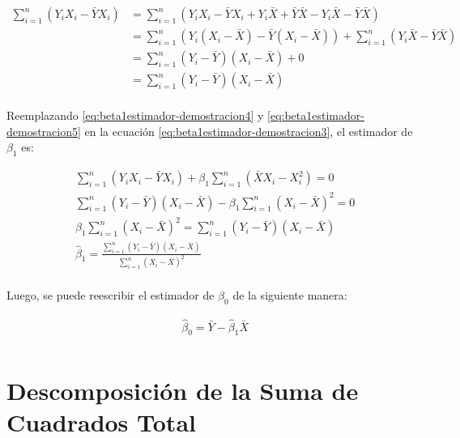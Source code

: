 \documentclass[
  11pt,
]{book}
\theoremstyle{definition}
\theoremstyle{definition}
\theoremstyle{definition}
\theoremstyle{definition}
\theoremstyle{remark}
\begin{document}
\begin{equation}
\begin{split}
\sum_{i=1}^n (Y_iX_i - \bar{Y}X_i) &= \sum_{i=1}^n (Y_iX_i - \bar{Y}X_i + Y_i\bar{X} + \bar{Y}\bar{X} - Y_i\bar{X} - \bar{Y}\bar{X})\\
&= \sum_{i=1}^n (Y_i(X_i - \bar{X}) - \bar{Y}(X_i - \bar{X})) + \sum_{i=1}^n(Y_i\bar{X} - \bar{Y}\bar{X}) \\
&= \sum_{i=1}^n (Y_i - \bar{Y})(X_i - \bar{X}) + 0 \\
&= \sum_{i=1}^n (Y_i - \bar{Y})(X_i - \bar{X})\\
\end{split}
\label{eq:beta1estimador-demostracion5}
\end{equation}

Reemplazando \eqref{eq:beta1estimador-demostracion4} y \eqref{eq:beta1estimador-demostracion5} en la ecuación \eqref{eq:beta1estimador-demostracion3}, el estimador de \(\beta_1\) es:

\begin{equation}
\begin{split}
&\sum_{i=1}^n (Y_iX_i - \bar{Y}X_i) + \beta_1\sum_{i=1}^n(\bar{X}X_i - X_i^2) = 0 \\
&\sum_{i=1}^n (Y_i - \bar{Y})(X_i - \bar{X}) - \beta_1\sum_{i=1}^n(X_i -\bar{X})^2 = 0 \\
&\beta_1\sum_{i=1}^n(X_i -\bar{X})^2 = \sum_{i=1}^n (Y_i - \bar{Y})(X_i - \bar{X}) \\
&\widehat{\beta}_1 = \frac{\displaystyle\sum_{i=1}^n (Y_i - \bar{Y})(X_i - \bar{X})}{\displaystyle\sum_{i=1}^n(X_i -\bar{X})^2} \\
\end{split}
\label{eq:beta1estimador-demostracion6}
\end{equation}

Luego, se puede reescribir el estimador de \(\beta_0\) de la siguiente manera:

\begin{equation}
\begin{split}
&\widehat{\beta}_0 = \bar{Y} - \widehat{\beta}_1\bar{X} \\
\end{split}
\label{eq:beta0estimador-demostracion3}
\end{equation}

\section{Descomposición de la Suma de Cuadrados Total}\label{descomposiciuxf3n-de-la-suma-de-cuadrados-total}
\end{document}
